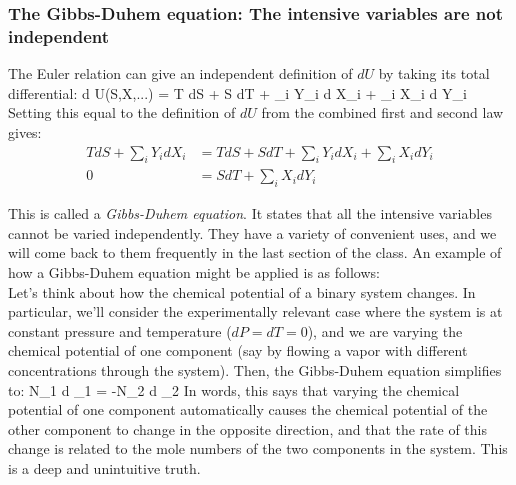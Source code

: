 \documentclass[12pt]{article}
\begin{document}




\subsubsection{The Gibbs-Duhem equation: The intensive variables are not independent}
The Euler relation can give an independent definition of $dU$ by taking its total differential:
\eqs
d U(S,X,...) = T dS + S dT + \sum_i Y_i d X_i + \sum_i X_i d Y_i 
\eqe
Setting this equal to the definition of $dU$ from the combined first and second law gives:
\begin{align*}
TdS + \sum_i Y_i dX_i&=T dS + S dT + \sum_i Y_i d X_i + \sum_i X_i d Y_i \\
0 &=S dT + \sum_i X_i d Y_i
\end{align*} 

This is called a \emph{Gibbs-Duhem equation}. It states that all the intensive variables cannot be varied independently. They have a variety of convenient uses, and we will come back to them frequently in the last section of the class. An example of how a Gibbs-Duhem equation might be applied is as follows:\\
Let's think about how the chemical potential of a binary system changes. In particular, we'll consider the experimentally relevant case where the system is at constant pressure and temperature ($dP=dT=0$), and we are varying the chemical potential of one component (say by flowing a vapor with different concentrations through the system). Then, the Gibbs-Duhem equation simplifies to:
\eqs N_1 d \mu_1 = -N_2 d \mu_2 \eqe
In words, this says that varying the chemical potential of one component automatically causes the chemical potential of the other component to change in the opposite direction, and that the rate of this change is related to the mole numbers  of the two components in the system. This is a deep and unintuitive truth.
\end{document}
